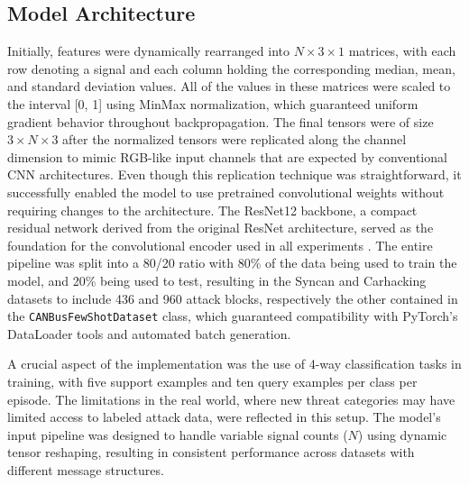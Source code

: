 \subsection{Model Architecture}
Initially, features were dynamically rearranged into $N \times 3 \times 1$ matrices, with each row denoting a signal and each column holding the corresponding median, mean, and standard deviation values. All of the values in these matrices were scaled to the interval [0, 1] using MinMax normalization, which guaranteed uniform gradient behavior throughout backpropagation. The final tensors were of size $3 \times N \times 3$ after the normalized tensors were replicated along the channel dimension to mimic RGB-like input channels that are expected by conventional CNN architectures. Even though this replication technique was straightforward, it successfully enabled the model to use pretrained convolutional weights without requiring changes to the architecture. The ResNet12 backbone, a compact residual network derived from the original ResNet architecture, served as the foundation for the convolutional encoder used in all experiments \cite{he2016resnet}. The entire pipeline was split into a 80/20 ratio with 80\% of the data being used to train the model, and 20\% being used to test, resulting in the Syncan and Carhacking datasets to include 436 and 960 attack blocks, respectively the other contained in the \texttt{CANBusFewShotDataset} class, which guaranteed compatibility with PyTorch's DataLoader tools and automated batch generation.

A crucial aspect of the implementation was the use of 4-way classification tasks in training, with five support examples and ten query examples per class per episode. The limitations in the real world, where new threat categories may have limited access to labeled attack data, were reflected in this setup. The model's input pipeline was designed to handle variable signal counts ($N$) using dynamic tensor reshaping, resulting in consistent performance across datasets with different message structures.
